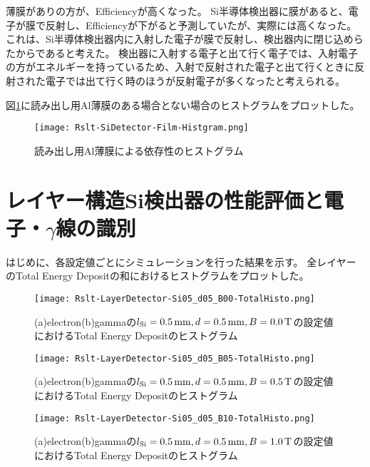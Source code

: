 \documentclass[a4paper,10pt]{jreport}
\begin{document}
薄膜がありの方が、Efficiencyが高くなった。
Si半導体検出器に膜があると、電子が膜で反射し、Efficiencyが下がると予測していたが、実際には高くなった。
これは、Si半導体検出器内に入射した電子が膜で反射し、検出器内に閉じ込めらたからであると考えた。
検出器に入射する電子と出て行く電子では、入射電子の方がエネルギーを持っているため、入射で反射された電子と出て行くときに反射された電子では出て行く時のほうが反射電子が多くなったと考えられる。

図\ref{Rslt-SiDetector-Film-Histgram}に読み出し用Al薄膜のある場合とない場合のヒストグラムをプロットした。

\begin{figure}[H]
	\center
	\texttt{[image: Rslt-SiDetector-Film-Histgram.png]}
	\caption{読み出し用Al薄膜による依存性のヒストグラム} \label{Rslt-SiDetector-Film-Histgram}
\end{figure}



\section{レイヤー構造Si検出器の性能評価と電子・$\gamma$線の識別}

はじめに、各設定値ごとにシミュレーションを行った結果を示す。
全レイヤーのTotal Energy Depositの和におけるヒストグラムをプロットした。

\begin{figure}[H]
	\center
	\texttt{[image: Rslt-LayerDetector-Si05\_d05\_B00-TotalHisto.png]}
	\caption{(a)electron(b)gammaの$l_{\rm{Si}}=\SI{0.5}{mm}, d=\SI{0.5}{mm}, B=\SI{0.0}{T}$の設定値におけるTotal Energy Depositのヒストグラム}
	\label{Rslt-LayerDetector-Si05_d05_B00-TotalHisto}
\end{figure}

\begin{figure}[H]
	\center
	\texttt{[image: Rslt-LayerDetector-Si05\_d05\_B05-TotalHisto.png]}
	\caption{(a)electron(b)gammaの$l_{\rm{Si}}=\SI{0.5}{mm}, d=\SI{0.5}{mm}, B=\SI{0.5}{T}$の設定値におけるTotal Energy Depositのヒストグラム}
	\label{Rslt-LayerDetector-Si05_d05_B05-TotalHisto}
\end{figure}

\begin{figure}[H]
	\center
	\texttt{[image: Rslt-LayerDetector-Si05\_d05\_B10-TotalHisto.png]}
	\caption{(a)electron(b)gammaの$l_{\rm{Si}}=\SI{0.5}{mm}, d=\SI{0.5}{mm}, B=\SI{1.0}{T}$の設定値におけるTotal Energy Depositのヒストグラム}
	\label{Rslt-LayerDetector-Si05_d05_B10-TotalHisto}
\end{figure}
\end{document}
